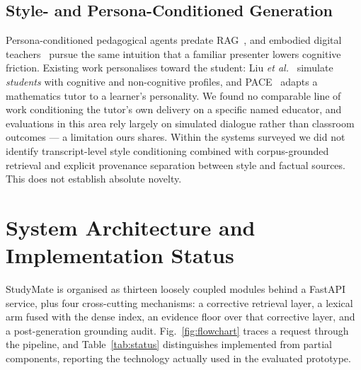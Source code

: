 \documentclass[conference]{IEEEtran}
\begin{document}
\subsection{Style- and Persona-Conditioned Generation}
Persona-conditioned pedagogical agents predate
RAG~\cite{liu2024persona,liu2025pace}, and embodied digital
teachers~\cite{zhao2024} pursue the same intuition that a familiar presenter
lowers cognitive friction. Existing work personalises toward the student: Liu
\textit{et al.}~\cite{liu2024persona} simulate \emph{students} with cognitive
and non-cognitive profiles, and PACE~\cite{liu2025pace} adapts a mathematics
tutor to a learner's personality. We found no comparable line of work
conditioning the tutor's own delivery on a specific named educator, and
evaluations in this area rely largely on simulated dialogue rather than
classroom outcomes --- a limitation ours shares. Within the systems surveyed we
did not identify transcript-level style conditioning combined with
corpus-grounded retrieval and explicit provenance separation between style and
factual sources. This does not establish absolute novelty.

\section{System Architecture and Implementation Status}
StudyMate is organised as thirteen loosely coupled modules behind a FastAPI
service, plus four cross-cutting mechanisms: a corrective retrieval layer, a
lexical arm fused with the dense index, an evidence floor over that corrective
layer, and a post-generation grounding audit.
Fig.~\ref{fig:flowchart} traces a request through the pipeline, and
Table~\ref{tab:status} distinguishes implemented from partial components,
reporting the technology actually used in the evaluated prototype.
\end{document}

